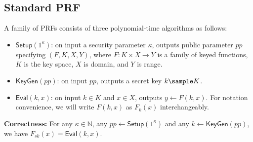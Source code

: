 \documentclass[a4paper,10pt]{article}
\begin{document}
\subsection{Standard PRF}
\begin{definition}[PRF]
A family of PRFs consists of three polynomial-time algorithms as follows: 
\begin{itemize}
\item $\mathsf{Setup}(1^\kappa)$: on input a security parameter $\kappa$, 
    outputs public parameter $pp$ specifying $(F, K, X, Y)$, 
    where $F: K \times X \rightarrow Y$ is a family of keyed functions, 
    $K$ is the key space, $X$ is domain, and $Y$ is range.

\item $\mathsf{KeyGen}(pp)$: on input $pp$, outputs a secret key $k \sample K$. 

\item $\mathsf{Eval}(k, x)$: on input $k \in K$ and $x \in X$, outputs $y \leftarrow F(k, x)$. 
    For notation convenience, we will write $F(k, x)$ as $F_k(x)$ interchangeably. 
\end{itemize}

\begin{trivlist}
\item \textbf{Correctness:} For any $\kappa \in \mathbb{N}$, 
    any $pp \leftarrow \mathsf{Setup}(1^\kappa)$ and any $k \leftarrow \mathsf{KeyGen}(pp)$, 
    we have $F_{sk}(x) = \mathsf{Eval}(k, x)$. 


\end{trivlist}
\end{definition}
\end{document}
